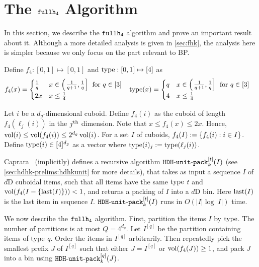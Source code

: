 \section{The \texorpdfstring{$\fhk[4]$}{fullh4} Algorithm}
\label{sec:fh4}

In this section, we describe the $\fhk[4]$ algorithm
and prove an important result about it.
Although a more detailed analysis is given in \cref{sec:fhk},
the analysis here is simpler because we only focus on the part relevant
to  BP.

Define $f_4: [0, 1] \mapsto [0, 1]$ and $\type: [0, 1] \mapsto [4]$ as
\begin{align*}
f_4(x) &= \begin{cases}
\frac{1}{q} & x \in \left(\left.\frac{1}{q+1}, \frac{1}{q}\right]\right. \textrm{ for } q \in [3]
\\ 2x & x \le \frac{1}{4} \end{cases}
& \type(x) &= \begin{cases}
q & x \in \left(\left.\frac{1}{q+1}, \frac{1}{q}\right]\right. \textrm{ for } q \in [3]
\\ 4 & x \le \frac{1}{4} \end{cases}
\end{align*}
\begin{comment}
\right)\right) %
\end{comment}

Let $i$ be a $d_g$-dimensional cuboid.
Define $f_4(i)$ as the cuboid of length $f_4(\ell_j(i))$ in the $j\Th$ dimension.
Note that $x \le f_4(x) \le 2x$.
Hence, $\vol(i) \le \vol(f_4(i)) \le 2^{d_g}\vol(i)$.
For a set $I$ of cuboids, $f_4(I) \defeq \{f_4(i): i \in I\}$.
Define $\type(i) \in [4]^{d_g}$ as a vector
where $\type(i)_j \defeq \type(\ell_j(i))$.

Caprara~\cite{caprara2008} (implicitly) defines a recursive algorithm $\hdhkunit^{[t]}(I)$
(see \cref{sec:hdhk-prelims:hdhkunit} for more details),
that takes as input a sequence $I$ of $d$D cuboidal items, such that
all items have the same $\type$ $t$ and $\vol(f_4(I-\{\last(I)\})) < 1$,
and returns a packing of $I$ into a $d$D bin.
Here $\last(I)$ is the last item in sequence $I$.
$\hdhkunit^{[t]}(I)$ runs in $O(|I|\log|I|)$ time.

We now describe the $\fhk[4]$ algorithm.
First, partition the items $I$ by $\type$. The number of partitions is at most $Q = 4^{d_g}$.
Let $I^{[q]}$ be the partition containing items of $\type$ $q$.
Order the items in $I^{[q]}$ arbitrarily.
Then repeatedly pick the smallest prefix $J$ of $I^{[q]}$ such that
either $J = I^{[q]}$ or $\vol(f_4(J)) \ge 1$, and pack $J$ into a bin using
$\hdhkunit^{[q]}(J)$.

